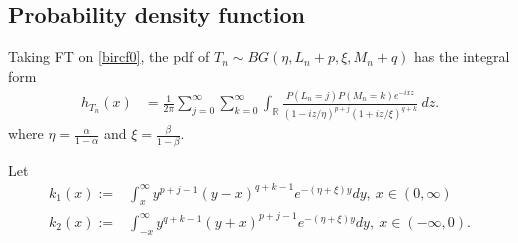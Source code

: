 \documentclass[12pt, a4paper,reqno]{amsart}
\theoremstyle{definition}
\theoremstyle{myremark}
\numberwithin{equation}{section}
\begin{document}
\subsection{Probability density function}\label{pdfTn}
Taking FT on \eqref{bircf0}, the pdf of $T_n\sim BG (\eta,L_n+p,\xi, M_n+q)$ has the integral form
\begin{align}\label{birpdf0}
h_{T_n}(x)&=\frac{1}{2\pi}\sum_{j=0}^{\infty}\sum_{k=0}^{\infty}\int_{\mathbb{R}}\frac{P(L_n=j)P(M_n=k) e^{-ixz}}{(1 -iz/\eta)^{p+j} (1 +iz/\xi)^{q+k}}~dz.
\end{align}
\noindent
where $\eta=\frac{\alpha}{1-\alpha}$ and $\xi=\frac{\beta}{1-\beta}$.


 Let
 \begin{align*}
  k_1(x):= & \int_{x}^{\infty}y^{p+j-1}(y-x)^{q+k-1}e^{-(\eta+\xi)y}dy  ,~x\in(0,\infty)\\
   k_2(x):= &\int_{-x}^{\infty}y^{q+k-1}(y+x)^{p+j-1}e^{-(\eta+\xi)y}dy  ,~x\in(-\infty,0). 
\end{align*}
\end{document}
